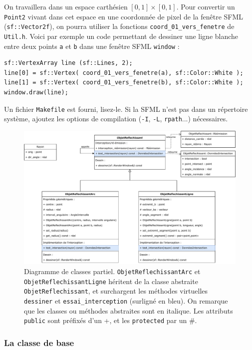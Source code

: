 \documentclass{book}
\newcommand{\inline}[1]{\texttt{#1}}
\def\filename{\texttt}
\begin{document}
On travaillera dans un espace carthésien $[0,1]\times[0,1]$. Pour convertir un \inline{Point2} vivant dans cet espace en une coordonnée de pixel de la fenêtre SFML (\inline{sf::Vector2f}), on pourra utiliser la fonctions \inline{coord_01_vers_fenetre} de \filename{Util.h}. Voici par exemple un code permettant de dessiner une ligne blanche entre deux points \inline{a} et \inline{b} dans une fenêtre SFML \inline{window} :
\begin{verbatim}
sf::VertexArray line (sf::Lines, 2);
line[0] = sf::Vertex( coord_01_vers_fenetre(a), sf::Color::White );
line[1] = sf::Vertex( coord_01_vers_fenetre(b), sf::Color::White );
window.draw(line);
\end{verbatim}

Un fichier \filename{Makefile} est fourni, lisez-le. Si la SFML n'est pas dans un répertoire système, ajoutez les options de compilation (\texttt{-I}, \texttt{-L}, \texttt{rpath}...) nécessaires.

\begin{figure}[H]
  \centering
  \includegraphics[width=\textwidth]{TD5/class-diagram.pdf}
  \caption{Diagramme de classes partiel. \texttt{ObjetReflechissantArc} et \texttt{ObjetReflechissantLigne} héritent de la classe abstraite \texttt{ObjetReflechissant}, et surchargent les méthodes virtuelles \inline{dessiner} et \inline{essai_interception} (surligné en bleu). On remarque que les classes ou méthodes abstraites sont en italique. Les attributs \inline{public} sont préfixés d'un +, et les \inline{protected} par un \#.}
  \label{fig:diagclasses1}
\end{figure}

\subsubsection{La classe de base}
\end{document}
